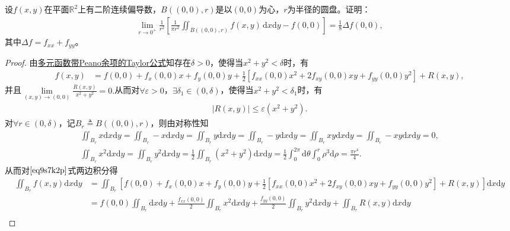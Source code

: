 \documentclass[../../main.tex]{subfiles}%
\begin{document}
\begin{example}
设$f(x,y)$在平面$\mathbb{R}^2$上有二阶连续偏导数，$B((0,0),r)$是以$(0,0)$为心，$r$为半径的圆盘。证明：
\begin{align*}
\lim\limits_{r \to 0^+} \frac{1}{r^2} \left[ \frac{1}{\pi r^2} \iint_{B((0,0),r)} f(x,y) \, \mathrm{d}x\mathrm{d}y - f(0,0) \right] = \frac{1}{8} \Delta f(0,0),
\end{align*}
其中$\Delta f = f_{xx} + f_{yy}$。
\end{example}
\begin{proof}

由\hyperref[theorem:多元函数带Peano余项的Taylor公式]{多元函数带Peano余项的Taylor公式}知存在$\delta >0$，使得当$x^2+y^2<\delta$时，有
\begin{align}
f(x,y) &= f(0,0) + f_x(0,0)x + f_y(0,0)y + \frac{1}{2}\left[ f_{xx}(0,0)x^2 + 2f_{xy}(0,0)xy + f_{yy}(0,0)y^2 \right] + R(x,y), \label{eq9s7k2p}
\end{align}
并且$\lim\limits_{(x,y) \to (0,0)} \frac{R(x,y)}{x^2+y^2}=0.$从而对$\forall \varepsilon >0$，$\exists \delta_1 \in (0,\delta)$，使得当$x^2+y^2<\delta_1$时，有
\begin{align}
|R(x,y)| \leqslant \varepsilon (x^2+y^2). \label{eq4z8m1n}
\end{align}
对$\forall r \in (0,\delta)$，记$B_r \triangleq B((0,0),r)$，则由对称性知
\begin{gather*}
\iint_{B_r} x\mathrm{d}x\mathrm{d}y=\iint_{B_r} -x\mathrm{d}x\mathrm{d}y=\iint_{B_r} y\mathrm{d}x\mathrm{d}y=\iint_{B_r} -y\mathrm{d}x\mathrm{d}y=\iint_{B_r} xy\mathrm{d}x\mathrm{d}y=\iint_{B_r} -xy\mathrm{d}x\mathrm{d}y=0, \\
\iint_{B_r} x^2\mathrm{d}x\mathrm{d}y=\iint_{B_r} y^2\mathrm{d}x\mathrm{d}y=\frac{1}{2}\iint_{B_r} (x^2+y^2)\mathrm{d}x\mathrm{d}y=\frac{1}{2}\int_0^{2\pi}\mathrm{d}\theta \int_0^r \rho^3\mathrm{d}\rho=\frac{\pi r^4}{4}.
\end{gather*}
从而对$\eqref{eq9s7k2p}$式两边积分得
\begin{align}
\iint_{B_r} f(x,y)\mathrm{d}x\mathrm{d}y &= \iint_{B_r} \left[ f(0,0) + f_x(0,0)x + f_y(0,0)y + \frac{1}{2}\left[ f_{xx}(0,0)x^2 + 2f_{xy}(0,0)xy + f_{yy}(0,0)y^2 \right] + R(x,y) \right] \mathrm{d}x\mathrm{d}y \nonumber \\
&= f(0,0)\iint_{B_r}\mathrm{d}x\mathrm{d}y + \frac{f_{xx}(0,0)}{2}\iint_{B_r}x^2\mathrm{d}x\mathrm{d}y + \frac{f_{yy}(0,0)}{2}\iint_{B_r}y^2\mathrm{d}x\mathrm{d}y + \iint_{B_r}R(x,y)\mathrm{d}x\mathrm{d}y \nonumber \\

\end{align}
\end{proof}
\end{document}
